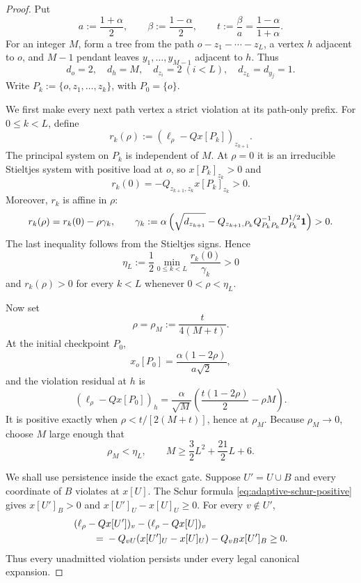 \begin{proof}
Put
\[
 a:=\frac{1+\alpha}{2},
 \qquad
 \beta:=\frac{1-\alpha}{2},
 \qquad
 t:=\frac{\beta}{a}=\frac{1-\alpha}{1+\alpha}.
\]
For an integer $M$, form a tree from the path
$o-z_1-\cdots-z_L$, a vertex $h$ adjacent to $o$, and $M-1$ pendant leaves
$y_1,\ldots,y_{M-1}$ adjacent to $h$.  Thus
\[
 d_o=2,
 \quad d_h=M,
 \quad d_{z_i}=2\ (i<L),
 \quad d_{z_L}=d_{y_j}=1.
\]
Write $P_k:=\{o,z_1,\ldots,z_k\}$, with $P_0=\{o\}$.

We first make every next path vertex a strict violation at its path-only
prefix.  For $0\leq k<L$, define
\[
 r_k(\rho):=(\ell_\rho-Qx[P_k])_{z_{k+1}}.
\]
The principal system on $P_k$ is independent of $M$.  At $\rho=0$ it is an
irreducible Stieltjes system with positive load at $o$, so
$x[P_k]_{z_k}>0$ and
\[
 r_k(0)=-Q_{z_{k+1},z_k}x[P_k]_{z_k}>0.
\]
Moreover, $r_k$ is affine in $\rho$:
\begin{equation}
 r_k(\rho)=r_k(0)-\rho\gamma_k,
 \qquad
 \gamma_k:=\alpha\left(
  \sqrt{d_{z_{k+1}}}
  -Q_{z_{k+1},P_k}Q_{P_kP_k}^{-1}
       D_{P_k}^{1/2}\mathbf{1}
 \right)>0.
 \label{eq:path-prefix-margin}
\end{equation}
The last inequality follows from the Stieltjes signs.  Hence
\begin{equation}
 \eta_L:=\frac12\min_{0\leq k<L}\frac{r_k(0)}{\gamma_k}>0
 \label{eq:path-prefix-eta}
\end{equation}
and $r_k(\rho)>0$ for every $k<L$ whenever $0<\rho<\eta_L$.

Now set
\begin{equation}
 \rho=\rho_M:=\frac{t}{4(M+t)}.
 \label{eq:heavy-rho}
\end{equation}
At the initial checkpoint $P_0$,
\[
 x_o[P_0]=\frac{\alpha(1-2\rho)}{a\sqrt2},
\]
and the violation residual at $h$ is
\begin{equation}
 (\ell_\rho-Qx[P_0])_h
 =\frac{\alpha}{\sqrt M}
  \left(\frac{t(1-2\rho)}2-\rho M\right).
 \label{eq:heavy-initial-margin}
\end{equation}
It is positive exactly when $\rho<t/[2(M+t)]$, hence at $\rho_M$.
Because $\rho_M\to0$, choose $M$ large enough that
\begin{equation}
 \rho_M<\eta_L,
 \qquad
 M\geq\frac32L^2+\frac{21}{2}L+6.
 \label{eq:heavy-M-choice}
\end{equation}

We shall use persistence inside the exact gate.  Suppose
$U'=U\cup B$ and every coordinate of $B$ violates at $x[U]$.  The Schur
formula \eqref{eq:adaptive-schur-positive} gives
$x[U']_B>0$ and $x[U']_U-x[U]_U\geq0$.  For every $v\notin U'$,
\begin{align}
 &(\ell_\rho-Qx[U'])_v-(\ell_\rho-Qx[U])_v \notag\\
 &\qquad={}-Q_{vU}(x[U']_U-x[U]_U)-Q_{vB}x[U']_B\geq0.
 \label{eq:rppr-violation-persistence}
\end{align}
Thus every unadmitted violation persists under every legal canonical
expansion.


\end{proof}
